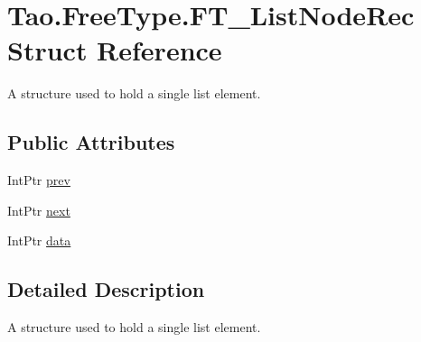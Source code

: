 \hypertarget{struct_tao_1_1_free_type_1_1_f_t___list_node_rec}{
\section{Tao.FreeType.FT\_\-ListNodeRec Struct Reference}
\label{struct_tao_1_1_free_type_1_1_f_t___list_node_rec}
}


A structure used to hold a single list element.  


\subsection*{Public Attributes}
\begin{DoxyCompactItemize}
\item 
IntPtr \hyperlink{struct_tao_1_1_free_type_1_1_f_t___list_node_rec_a571ee3756f6fcbb1c48b1759eb83c4e8}{prev}
\item 
IntPtr \hyperlink{struct_tao_1_1_free_type_1_1_f_t___list_node_rec_a207244252253e22f41a3ddc15bd1415b}{next}
\item 
IntPtr \hyperlink{struct_tao_1_1_free_type_1_1_f_t___list_node_rec_ac62520315cb08535722892877c6a6245}{data}
\end{DoxyCompactItemize}


\subsection{Detailed Description}
A structure used to hold a single list element. 

